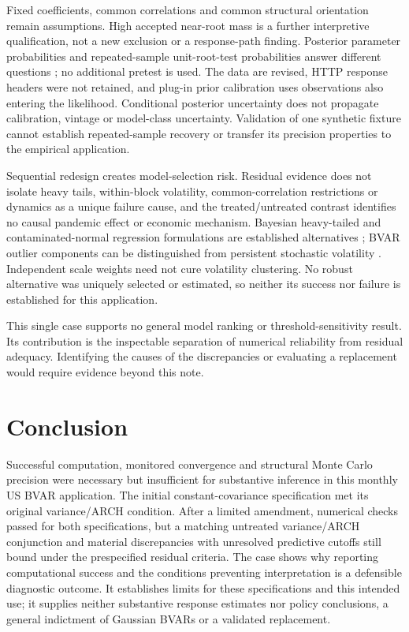 \documentclass[11pt,a4paper]{article}
\begin{document}
Fixed coefficients, common correlations and common structural orientation remain assumptions. High accepted near-root mass is a further interpretive qualification, not a new exclusion or a response-path finding. Posterior parameter probabilities and repeated-sample unit-root-test probabilities answer different questions \cite{su1991}; no additional pretest is used. The data are revised, HTTP response headers were not retained, and plug-in prior calibration uses observations also entering the likelihood. Conditional posterior uncertainty does not propagate calibration, vintage or model-class uncertainty. Validation of one synthetic fixture cannot establish repeated-sample recovery or transfer its precision properties to the empirical application.

Sequential redesign creates model-selection risk. Residual evidence does not isolate heavy tails, within-block volatility, common-correlation restrictions or dynamics as a unique failure cause, and the treated/untreated contrast identifies no causal pandemic effect or economic mechanism. Bayesian heavy-tailed and contaminated-normal regression formulations are established alternatives \cite{liu1996}; BVAR outlier components can be distinguished from persistent stochastic volatility \cite{ccmm2024}. Independent scale weights need not cure volatility clustering. No robust alternative was uniquely selected or estimated, so neither its success nor failure is established for this application.

This single case supports no general model ranking or threshold-sensitivity result. Its contribution is the inspectable separation of numerical reliability from residual adequacy. Identifying the causes of the discrepancies or evaluating a replacement would require evidence beyond this note.

\section{Conclusion}
Successful computation, monitored convergence and structural Monte Carlo precision were necessary but insufficient for substantive inference in this monthly US BVAR application. The initial constant-covariance specification met its original variance/ARCH condition. After a limited amendment, numerical checks passed for both specifications, but a matching untreated variance/ARCH conjunction and material discrepancies with unresolved predictive cutoffs still bound under the prespecified residual criteria. The case shows why reporting computational success and the conditions preventing interpretation is a defensible diagnostic outcome. It establishes limits for these specifications and this intended use; it supplies neither substantive response estimates nor policy conclusions, a general indictment of Gaussian BVARs or a validated replacement.
\end{document}
